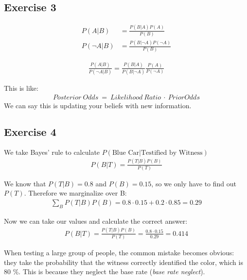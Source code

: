 %

\subsection*{Exercise 3}
\begin{align*}
P(A|B) & = \frac{P(B|A)P(A)}{P(B)} \\
P(\neg A|B) & = \frac{P(B|\neg A)P(\neg A)}{P(B)}
\end{align*}

\begin{align*}
\frac{P(A|B)}{P(\neg A|B)} = \frac{P(B|A)}{P(B|\neg A)} \frac{P(A)}{P(\neg A)}
\end{align*}

This is like:
\begin{align*}
Posterior\ Odds\ =\ Likelihood\ Ratio\ \cdot\ Prior Odds
\end{align*}
We can say this is updating your beliefs with new information.


\subsection*{Exercise 4}
We take Bayes' rule to calculate $P(\mbox{Blue Car}|\mbox{Testified by Witness})$
\begin{align*}
P(B|T) = \frac{P(T|B)P(B)}{P(T)}
\end{align*}

We know that $P(T|B) = 0.8$ and $P(B) = 0.15$, so we only have to find out $P(T)$. Therefore we marginalize over B:
\begin{align*}
\sum_{B}{P(T|B)P(B)} = 0.8 \cdot 0.15 + 0.2 \cdot 0.85 = 0.29
\end{align*}

Now we can take our values and calculate the correct answer:
\begin{align*}
P(B|T) = \frac{P(T|B)P(B)}{P(T)} = \frac{0.8 \cdot 0.15}{0.29} = 0.414
\end{align*}

When testing a large group of people, the common mistake becomes obvious: they take the probability that the witness correctly identified the color, which is 80 \%. This is because they neglect the base rate (\textit{base rate neglect}).


